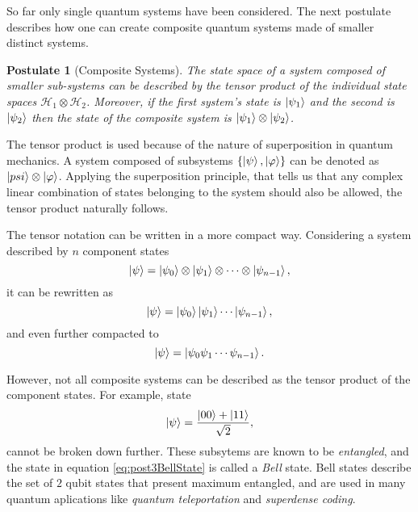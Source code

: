 \documentclass[../../../dissertation.tex]{subfiles}
\newtheorem{post}{Postulate}
\begin{document}
So far only single quantum systems have been considered. The next postulate
describes how one can create composite quantum systems made of smaller distinct
systems.
\begin{post}[Composite Systems]
	The state space of a system composed of smaller sub-systems can be
	described by the tensor product of the individual state spaces
	$\mathcal{H}_1\otimes\mathcal{H}_2$. Moreover, if the first system's
	state is $\ket{\psi_1}$ and the second is $\ket{\psi_2}$ then the state
	of the composite system is $\ket{\psi_1} \otimes \ket{\psi_2}$.  
\end{post}\par
The tensor product is used because of the nature of superposition in quantum
mechanics. A system composed of subsystems $\{\ket{\psi},\ket{\varphi}\}$ can
be denoted as $\ket{psi}\otimes\ket{\varphi}$. Applying the superposition principle,
that tells us that any complex linear combination of states belonging to the
system should also be allowed, the tensor product naturally follows.\par
The tensor notation can be written in a more compact way. Considering a system
described by $n$ component states \begin{equation}
	\ket{\psi} = \ket{\psi_0} \otimes \ket{\psi_1} \otimes \cdots \otimes \ket{\psi_{n-1}},
\end{equation}
it can be rewritten as 
\begin{equation}
	\ket{\psi} = \ket{\psi_0}\ket{\psi_1} \cdots \ket{\psi_{n-1}},
\end{equation}
and even further compacted to
\begin{equation}
	\ket{\psi} = \ket{\psi_0 \psi_1 \cdots \psi_{n-1}}.
\end{equation}\par
However, not all composite systems can be described as the tensor product of
the component states. For example, state 
\begin{equation}
	\label{eq:post3BellState}
	\ket{\psi} = \frac{\ket{00} +\ket{11}}{\sqrt{2}}, 
\end{equation}
cannot be broken down further. These subsytems are known to be
\textit{entangled}, and the state in equation \ref{eq:post3BellState} is called
a \textit{Bell} state. Bell states describe the set of $2$ qubit states that
present maximum entangled, and are used in many quantum aplications like
\textit{quantum teleportation} and \textit{superdense coding}.\par
\end{document}
